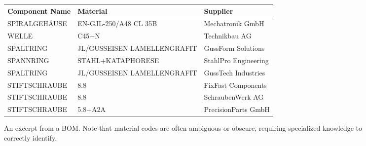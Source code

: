 \begin{figure*}[h!]

\begin{custommdframed}[userdefinedwidth=38em]

\begin{tabular}{l l l}

\textbf{Component Name} & \textbf{Material} & \textbf{Supplier} \\
\hline
SPIRALGEHÄUSE & EN-GJL-250/A48 CL 35B & Mechatronik GmbH \\
WELLE & C45+N & Technikbau AG \\
SPALTRING               & JL/GUSSEISEN LAMELLENGRAFIT & GussForm Solutions   \\
SPANNRING               & STAHL+KATAPHORESE           & StahlPro Engineering \\ 
SPALTRING               & JL/GUSSEISEN LAMELLENGRAFIT & GussTech Industries  \\ 
STIFTSCHRAUBE           & 8.8                        & FixFast Components   \\ 
STIFTSCHRAUBE           & 8.8                        & SchraubenWerk AG     \\ 
STIFTSCHRAUBE           & 5.8+A2A                    & PrecisionParts GmbH  \\ 

\end{tabular}

\end{custommdframed}
\rmfamily
\caption{An excerpt from  a BOM. Note that material codes are often ambiguous or obscure, requiring specialized knowledge to correctly identify.}
\label{bom}
\end{figure*}
